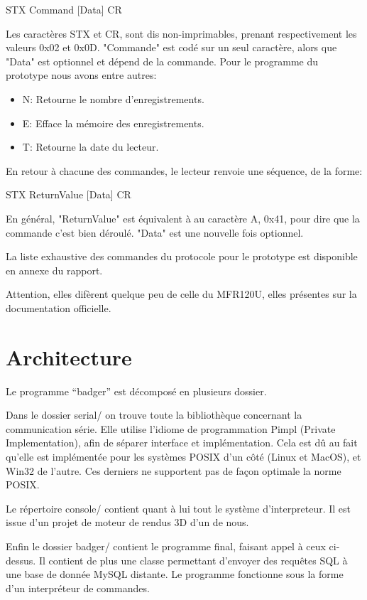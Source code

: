 STX Command [Data] CR

    Les caractères STX et CR, sont dis non-imprimables, prenant respectivement les
valeurs 0x02 et 0x0D. "Commande" est codé sur un seul caractère, alors que "Data"
est optionnel et dépend de la commande. Pour le programme du prototype nous avons
entre autres:

    \begin{itemize}
        \item N: Retourne le nombre d'enregistrements.
        \item E: Efface la mémoire des enregistrements.
        \item T: Retourne la date du lecteur.
    \end{itemize}

En retour à chacune des commandes, le lecteur renvoie une séquence, de la forme:

STX ReturnValue [Data] CR

    En général, "ReturnValue" est équivalent à au caractère A, 0x41, pour dire que
la commande c'est bien déroulé. "Data" est une nouvelle fois optionnel.

    La liste exhaustive des commandes du protocole pour le prototype est disponible
en annexe du rapport. 

    Attention, elles difèrent quelque peu de celle du MFR120U, elles présentes sur 
la documentation officielle.




\section{Architecture}
    Le programme ``badger'' est décomposé en plusieurs dossier. 

    Dans le dossier serial/ on trouve toute la bibliothèque concernant la communication
série. Elle utilise l'idiome de programmation Pimpl (Private Implementation), afin 
de séparer interface et implémentation. Cela est dû au fait qu'elle est implémentée
pour les systèmes POSIX d'un côté (Linux et MacOS), et Win32 de l'autre. Ces derniers
ne supportent pas de façon optimale la norme POSIX.

    Le répertoire console/ contient quant à lui tout le système d'interpreteur.
Il est issue d'un projet de moteur de rendus 3D d'un de nous.

    Enfin le dossier badger/ contient le programme final, faisant appel à ceux
ci-dessus. Il contient de plus une classe permettant d'envoyer des requêtes SQL
à une base de donnée MySQL distante. Le programme fonctionne sous la forme d'un 
interpréteur de commandes.





